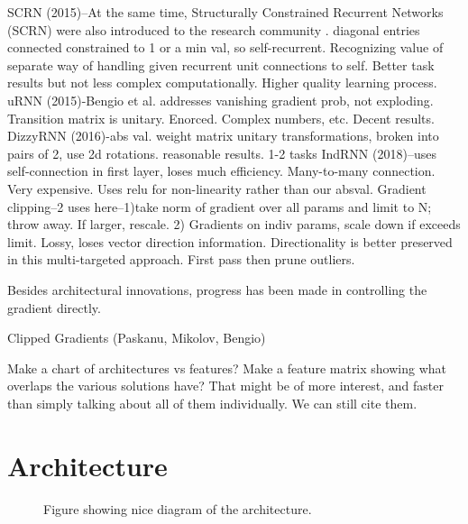 \documentclass{article}
\begin{document}
SCRN (2015)--At the same time, Structurally Constrained Recurrent Networks (SCRN) were also introduced to the research community . diagonal entries connected constrained to 1 or a min val, so self-recurrent.  Recognizing value of separate way of handling given recurrent unit connections to self.  Better task results but not less complex computationally. Higher quality learning process.
uRNN (2015)-Bengio et al.  addresses vanishing gradient prob, not exploding.  Transition matrix is unitary.  Enorced.  Complex numbers, etc. Decent results.
DizzyRNN (2016)-abs val. weight matrix unitary transformations, broken into pairs of 2, use 2d rotations. reasonable results. 1-2 tasks 
IndRNN  (2018)--uses self-connection in first layer, loses much efficiency.  Many-to-many connection. Very expensive.  Uses relu for non-linearity rather than our absval.  
Gradient clipping--2 uses here--1)take norm of gradient over all params and limit to N; throw away.  If larger, rescale.  2) Gradients on indiv params, scale down if exceeds limit.  Lossy, loses vector direction information. Directionality is better preserved in this multi-targeted approach. First pass then prune outliers.    

Besides architectural innovations, progress has been made in controlling the gradient directly.

Clipped Gradients (Paskanu, Mikolov, Bengio)

Make a chart of architectures vs features?
Make a feature matrix showing what overlaps the various solutions have? That might be of more interest, and faster than simply talking about all of them individually. We can still cite them.

\section{Architecture}
\label{headings}
\begin{figure}
  \centering
  
  \caption{Figure showing nice diagram of the architecture.}
\end{figure}
\end{document}
